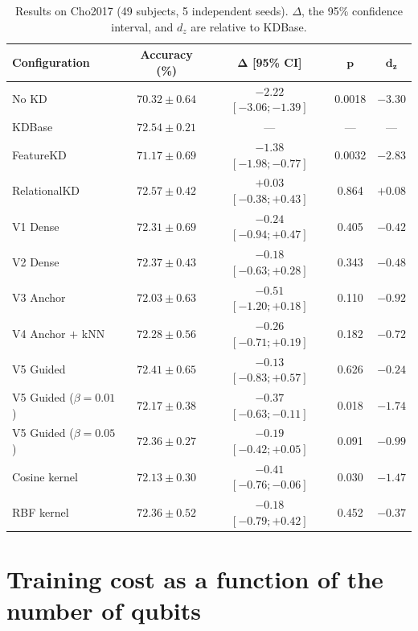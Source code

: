 \begin{table}[!htbp]
\centering
\caption{Results on Cho2017 (49 subjects, 5 independent seeds). $\Delta$, the 95\% confidence interval, and $d_z$ are relative to KDBase.}
\label{tab:cho2017}
\small
\begin{tabular}{lcccc}
\toprule
\textbf{Configuration} & \textbf{Accuracy (\%)} & $\boldsymbol{\Delta}$ \textbf{[95\% CI]} & $\boldsymbol{p}$ & $\boldsymbol{d_z}$ \\
\midrule
No KD & $70.32 \pm 0.64$ & $-2.22$ $[-3.06; -1.39]$ & 0.0018 & $-3.30$ \\
KDBase & $72.54 \pm 0.21$ & --- & --- & --- \\
FeatureKD & $71.17 \pm 0.69$ & $-1.38$ $[-1.98; -0.77]$ & 0.0032 & $-2.83$ \\
RelationalKD & $72.57 \pm 0.42$ & $+0.03$ $[-0.38; +0.43]$ & 0.864 & $+0.08$ \\
\midrule
V1 Dense & $72.31 \pm 0.69$ & $-0.24$ $[-0.94; +0.47]$ & 0.405 & $-0.42$ \\
V2 Dense & $72.37 \pm 0.43$ & $-0.18$ $[-0.63; +0.28]$ & 0.343 & $-0.48$ \\
V3 Anchor & $72.03 \pm 0.63$ & $-0.51$ $[-1.20; +0.18]$ & 0.110 & $-0.92$ \\
V4 Anchor $+$ kNN & $72.28 \pm 0.56$ & $-0.26$ $[-0.71; +0.19]$ & 0.182 & $-0.72$ \\
V5 Guided & $72.41 \pm 0.65$ & $-0.13$ $[-0.83; +0.57]$ & 0.626 & $-0.24$ \\
V5 Guided ($\beta = 0.01$) & $72.17 \pm 0.38$ & $-0.37$ $[-0.63; -0.11]$ & 0.018 & $-1.74$ \\
V5 Guided ($\beta = 0.05$) & $72.36 \pm 0.27$ & $-0.19$ $[-0.42; +0.05]$ & 0.091 & $-0.99$ \\
\midrule
Cosine kernel & $72.13 \pm 0.30$ & $-0.41$ $[-0.76; -0.06]$ & 0.030 & $-1.47$ \\
RBF kernel & $72.36 \pm 0.52$ & $-0.18$ $[-0.79; +0.42]$ & 0.452 & $-0.37$ \\
\bottomrule
\end{tabular}
\end{table}
\FloatBarrier

\section{Training cost as a function of the number of qubits}
\label{app:qubit}

